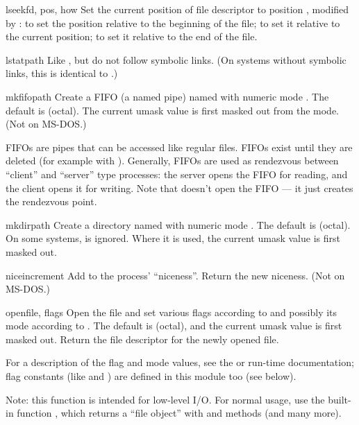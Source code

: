 \begin{funcdesc}{lseek}{fd, pos, how}
Set the current position of file descriptor  to position
, modified by :  to set the position
relative to the beginning of the file;  to set it relative to
the current position;  to set it relative to the end of the
file.
\end{funcdesc}

\begin{funcdesc}{lstat}{path}
Like , but do not follow symbolic links.  (On systems
without symbolic links, this is identical to .)
\end{funcdesc}

\begin{funcdesc}{mkfifo}{path}
Create a FIFO (a \POSIX{} named pipe) named  with numeric mode
.  The default  is  (octal).  The current
umask value is first masked out from the mode.
(Not on MS-DOS.)

FIFOs are pipes that can be accessed like regular files.  FIFOs exist
until they are deleted (for example with ).
Generally, FIFOs are used as rendezvous between ``client'' and
``server'' type processes: the server opens the FIFO for reading, and
the client opens it for writing.  Note that 
doesn't open the FIFO --- it just creates the rendezvous point.
\end{funcdesc}

\begin{funcdesc}{mkdir}{path}
Create a directory named  with numeric mode .
The default  is  (octal).  On some systems,
 is ignored.  Where it is used, the current umask value is
first masked out.
\end{funcdesc}

\begin{funcdesc}{nice}{increment}
Add  to the process' ``niceness''.  Return the new
niceness.  (Not on MS-DOS.)
\end{funcdesc}

\begin{funcdesc}{open}{file, flags}
Open the file  and set various flags according to
 and possibly its mode according to .
The default  is  (octal), and the current umask
value is first masked out.  Return the file descriptor for the newly
opened file.

For a description of the flag and mode values, see the \UNIX{} or \C{}
run-time documentation; flag constants (like  and
) are defined in this module too (see below).

Note: this function is intended for low-level I/O.  For normal usage,
use the built-in function , which returns a ``file
object'' with  and  methods (and many
more).
\end{funcdesc}


